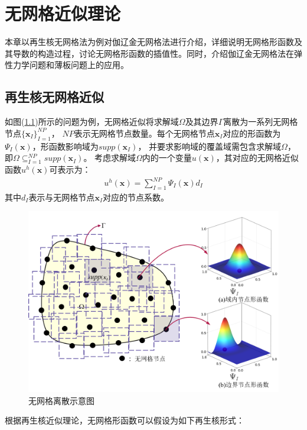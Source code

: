 \chapter{无网格近似理论}
本章以再生核无网格法为例对伽辽金无网格法进行介绍，详细说明无网格形函数及其导数的构造过程，讨论无网格形函数的插值性。同时，介绍伽辽金无网格法在弹性力学问题和薄板问题上的应用。
\section{再生核无网格近似}
如图(\ref{nomeshpoint})所示的问题为例，无网格近似将求解域$\Omega$及其边界$\Gamma$离散为一系列无网格节点$\{\pmb{x}_I\}^{N\!P}_{I=1}$，
$N\!P$表示无网格节点数量。每个无网格节点$\pmb{x}_I$对应的形函数为$\Psi_I(\pmb{x})$，形函数影响域为$supp(\pmb{x}_I)$，
并要求影响域的覆盖域需包含求解域$\Omega$，即$\Omega\subseteq^{N\!P}_{I=1}supp(\pmb{x}_I)$。
考虑求解域$\Omega$内的一个变量$u(\pmb{x})$，其对应的无网格近似函数$u^h(\pmb{x})$可表示为：
\begin{equation}\label{ui}
\begin{split}
    u^h(\pmb{x})=\sum_{I=1}^{N\!P}\Psi_I(\pmb{x})d_{I}
\end{split}
\end{equation}
其中$d_{I}$表示与无网格节点$\pmb{x}_I$对应的节点系数。\par
\begin{figure}[H]
\centering
    \includegraphics[scale=0.6]{Figure/nomesh/point.png}
    \caption{无网格离散示意图}\label{nomeshpoint}
\end{figure}\par
根据再生核近似理论\cite{liuReproducingKernelParticle1995}，无网格形函数可以假设为如下再生核形式：
